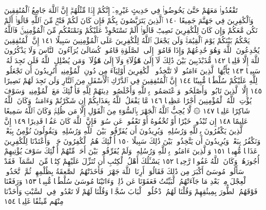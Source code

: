 تَقْعُدُوا۟ مَعَهُمْ حَتَّىٰ يَخُوضُوا۟ فِي حَدِيثٍ غَيْرِهِۦٓ إِنَّكُمْ إِذࣰا مِّثْلُهُمْۗ
إِنَّ ٱللَّهَ جَامِعُ ٱلْمُنَٰفِقِينَ وَٱلْكَٰفِرِينَ فِي جَهَنَّمَ جَمِيعًا ١٤٠
ٱلَّذِينَ يَتَرَبَّصُونَ بِكُمْ فَإِن كَانَ لَكُمْ فَتْحࣱ مِّنَ ٱللَّهِ قَالُوٓا۟
أَلَمْ نَكُن مَّعَكُمْ وَإِن كَانَ لِلْكَٰفِرِينَ نَصِيبࣱ قَالُوٓا۟
أَلَمْ نَسْتَحْوِذْ عَلَيْكُمْ وَنَمْنَعْكُم مِّنَ ٱلْمُؤْمِنِينَۚ فَٱللَّهُ يَحْكُمُ
بَيْنَكُمْ يَوْمَ ٱلْقِيَٰمَةِۚ وَلَن يَجْعَلَ ٱللَّهُ لِلْكَٰفِرِينَ عَلَى ٱلْمُؤْمِنِينَ
سَبِيلًا ١٤١ إِنَّ ٱلْمُنَٰفِقِينَ يُخَٰدِعُونَ ٱللَّهَ وَهُوَ خَٰدِعُهُمْ وَإِذَا
قَامُوٓا۟ إِلَى ٱلصَّلَوٰةِ قَامُوا۟ كُسَالَىٰ يُرَآءُونَ ٱلنَّاسَ وَلَا يَذْكُرُونَ
ٱللَّهَ إِلَّا قَلِيلࣰا ١٤٢ مُّذَبْذَبِينَ بَيْنَ ذَٰلِكَ لَآ إِلَىٰ هَٰٓؤُلَآءِ وَلَآ إِلَىٰ
هَٰٓؤُلَآءِۚ وَمَن يُضْلِلِ ٱللَّهُ فَلَن تَجِدَ لَهُۥ سَبِيلࣰا ١٤٣ يَٰٓأَيُّهَا ٱلَّذِينَ
ءَامَنُوا۟ لَا تَتَّخِذُوا۟ ٱلْكَٰفِرِينَ أَوْلِيَآءَ مِن دُونِ ٱلْمُؤْمِنِينَۚ
أَتُرِيدُونَ أَن تَجْعَلُوا۟ لِلَّهِ عَلَيْكُمْ سُلْطَٰنࣰا مُّبِينًا ١٤٤ إِنَّ
ٱلْمُنَٰفِقِينَ فِي ٱلدَّرْكِ ٱلْأَسْفَلِ مِنَ ٱلنَّارِ وَلَن تَجِدَ لَهُمْ نَصِيرًا ١٤٥
إِلَّا ٱلَّذِينَ تَابُوا۟ وَأَصْلَحُوا۟ وَٱعْتَصَمُوا۟ بِٱللَّهِ وَأَخْلَصُوا۟
دِينَهُمْ لِلَّهِ فَأُو۟لَٰٓئِكَ مَعَ ٱلْمُؤْمِنِينَۖ وَسَوْفَ يُؤْتِ ٱللَّهُ
ٱلْمُؤْمِنِينَ أَجْرًا عَظِيمࣰا ١٤٦ مَّا يَفْعَلُ ٱللَّهُ بِعَذَابِكُمْ
إِن شَكَرْتُمْ وَءَامَنتُمْۚ وَكَانَ ٱللَّهُ شَاكِرًا عَلِيمࣰا ١٤٧
۞ لَّا يُحِبُّ ٱللَّهُ ٱلْجَهْرَ بِٱلسُّوٓءِ مِنَ ٱلْقَوْلِ إِلَّا مَن ظُلِمَۚ وَكَانَ
ٱللَّهُ سَمِيعًا عَلِيمًا ١٤٨ إِن تُبْدُوا۟ خَيْرًا أَوْ تُخْفُوهُ أَوْ تَعْفُوا۟ عَن
سُوٓءࣲ فَإِنَّ ٱللَّهَ كَانَ عَفُوࣰّا قَدِيرًا ١٤٩ إِنَّ ٱلَّذِينَ يَكْفُرُونَ
بِٱللَّهِ وَرُسُلِهِۦ وَيُرِيدُونَ أَن يُفَرِّقُوا۟ بَيْنَ ٱللَّهِ وَرُسُلِهِۦ وَيَقُولُونَ
نُؤْمِنُ بِبَعْضࣲ وَنَكْفُرُ بِبَعْضࣲ وَيُرِيدُونَ أَن يَتَّخِذُوا۟
بَيْنَ ذَٰلِكَ سَبِيلًا ١٥٠ أُو۟لَٰٓئِكَ هُمُ ٱلْكَٰفِرُونَ حَقࣰّاۚ وَأَعْتَدْنَا
لِلْكَٰفِرِينَ عَذَابࣰا مُّهِينࣰا ١٥١ وَٱلَّذِينَ ءَامَنُوا۟ بِٱللَّهِ وَرُسُلِهِۦ
وَلَمْ يُفَرِّقُوا۟ بَيْنَ أَحَدࣲ مِّنْهُمْ أُو۟لَٰٓئِكَ سَوْفَ يُؤْتِيهِمْ
أُجُورَهُمْۚ وَكَانَ ٱللَّهُ غَفُورࣰا رَّحِيمࣰا ١٥٢ يَسْـَٔلُكَ أَهْلُ ٱلْكِتَٰبِ
أَن تُنَزِّلَ عَلَيْهِمْ كِتَٰبࣰا مِّنَ ٱلسَّمَآءِۚ فَقَدْ سَأَلُوا۟ مُوسَىٰٓ أَكْبَرَ
مِن ذَٰلِكَ فَقَالُوٓا۟ أَرِنَا ٱللَّهَ جَهْرَةࣰ فَأَخَذَتْهُمُ ٱلصَّٰعِقَةُ بِظُلْمِهِمْۚ
ثُمَّ ٱتَّخَذُوا۟ ٱلْعِجْلَ مِنۢ بَعْدِ مَا جَآءَتْهُمُ ٱلْبَيِّنَٰتُ فَعَفَوْنَا
عَن ذَٰلِكَۚ وَءَاتَيْنَا مُوسَىٰ سُلْطَٰنࣰا مُّبِينࣰا ١٥٣ وَرَفَعْنَا فَوْقَهُمُ
ٱلطُّورَ بِمِيثَٰقِهِمْ وَقُلْنَا لَهُمُ ٱدْخُلُوا۟ ٱلْبَابَ سُجَّدࣰا وَقُلْنَا
لَهُمْ لَا تَعْدُوا۟ فِي ٱلسَّبْتِ وَأَخَذْنَا مِنْهُم مِّيثَٰقًا غَلِيظࣰا ١٥٤
